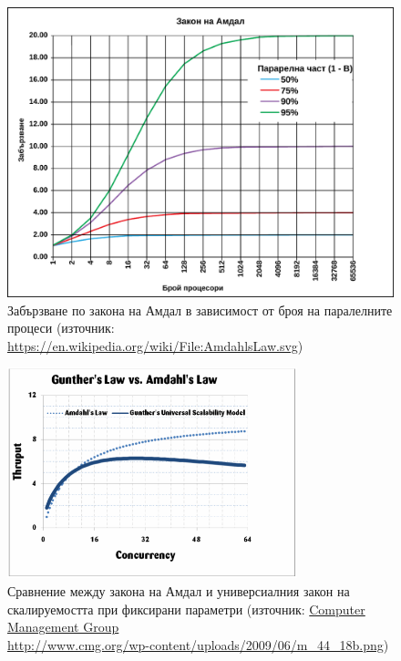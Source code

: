 \begin{figure}
  \includegraphics[width=\textwidth]{images/amdahls-law.pdf}
  \caption[Забързване по закона на Амдал в зависимост от броя на паралелните процеси]{Забързване по закона на Амдал в зависимост от броя на паралелните процеси (източник: \footnotesize\url{https://en.wikipedia.org/wiki/File:AmdahlsLaw.svg})}
  \label{fig:amdahls-law}
\end{figure}

\begin{figure}
  \centering\includegraphics[width=0.75\textwidth]{images/gunthers-amdahls-laws.png}
  \caption[Сравнение между закона на Амдал и и универсиалния закон на скалируемостта при фиксирани параметри]{Сравнение между закона на Амдал и универсиалния закон на скалируемостта при фиксирани параметри (източник: \href{http://www.cmg.org/publications/measureit/2007-2/mit44/measureit-issue-5-09-a-review-of-beginning-excel-what-if-data-analysis-tools-getting-started-with-goal-seek-data-tables-scenarios-and-solver-by-michael-s-hines/}{Computer Management Group\\
      http://www.cmg.org/wp-content/uploads/2009/06/m\_44\_18b.png})}
  \label{fig:gunthers-law}
\end{figure}

